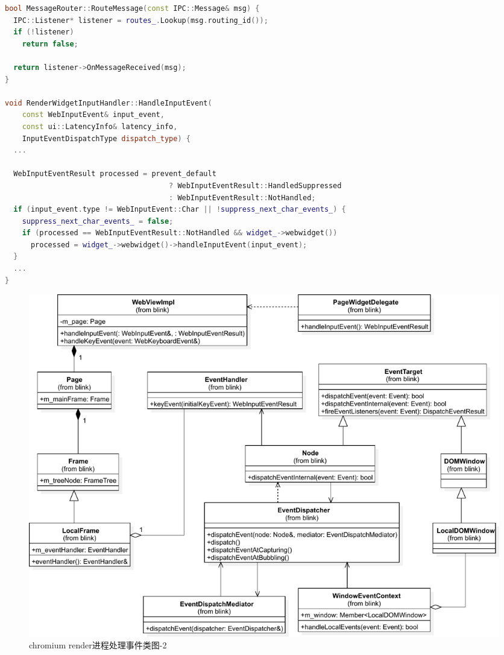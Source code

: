 \documentclass[12pt]{article}
\begin{document}
\begin{spacing}{1.0}
\begin{lstlisting}[language={C++}]
bool MessageRouter::RouteMessage(const IPC::Message& msg) {
  IPC::Listener* listener = routes_.Lookup(msg.routing_id());
  if (!listener)
    return false;

  return listener->OnMessageReceived(msg);
}

void RenderWidgetInputHandler::HandleInputEvent(
    const WebInputEvent& input_event,
    const ui::LatencyInfo& latency_info,
    InputEventDispatchType dispatch_type) {
  ...
  
  WebInputEventResult processed = prevent_default
                                      ? WebInputEventResult::HandledSuppressed
                                      : WebInputEventResult::NotHandled;
  if (input_event.type != WebInputEvent::Char || !suppress_next_char_events_) {
    suppress_next_char_events_ = false;
    if (processed == WebInputEventResult::NotHandled && widget_->webwidget())
      processed = widget_->webwidget()->handleInputEvent(input_event);
  }
  ...  
}
\end{lstlisting}
\end{spacing}


\begin{figure}[H] 
  \centering 
  \includegraphics[width=\textwidth]{image/render_event_handle_class.pdf} 
  \caption{chromium render进程处理事件类图-2} \label{fig:render_event_handle_class} 
\end{figure}
\end{document}
